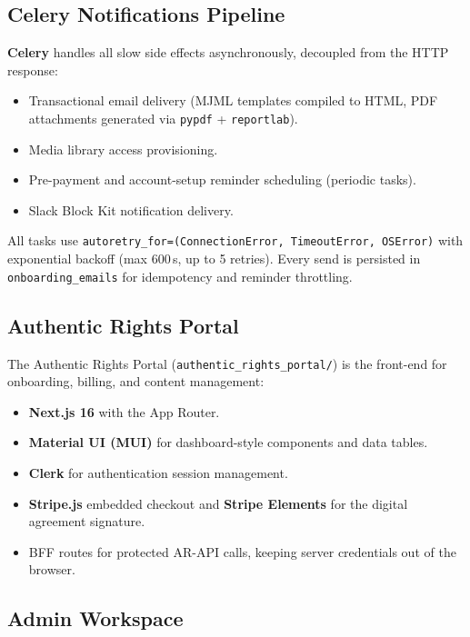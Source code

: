 \subsection{Celery Notifications Pipeline}

\textbf{Celery} handles all slow side effects asynchronously, decoupled from the HTTP response:

\begin{itemize}
  \item Transactional email delivery (MJML templates compiled to HTML, PDF attachments generated
    via \texttt{pypdf} + \texttt{reportlab}).
  \item Media library access provisioning.
  \item Pre-payment and account-setup reminder scheduling (periodic tasks).
  \item Slack Block Kit notification delivery.
\end{itemize}

All tasks use \texttt{autoretry\_for=(ConnectionError, TimeoutError, OSError)} with exponential
backoff (max 600\,s, up to 5 retries). Every send is persisted in \texttt{onboarding\_emails} for
idempotency and reminder throttling.

\subsection{Authentic Rights Portal}

The Authentic Rights Portal (\texttt{authentic\_rights\_portal/}) is the front-end for
onboarding, billing, and content management:

\begin{itemize}
  \item \textbf{Next.js 16} with the App Router.
  \item \textbf{Material UI (MUI)} for dashboard-style components and data tables.
  \item \textbf{Clerk} for authentication session management.
  \item \textbf{Stripe.js} embedded checkout and \textbf{Stripe Elements} for the digital
    agreement signature.
  \item BFF routes for protected AR-API calls, keeping server credentials out of the browser.
\end{itemize}

\subsection{Admin Workspace}

